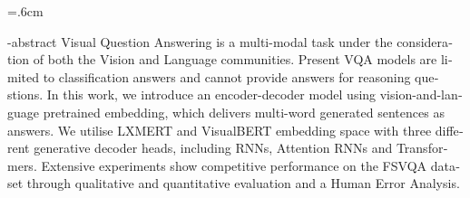 
\baselineskip=.6cm
\begin{latin}
\en-abstract{
  Visual Question Answering is a multi-modal task under the consideration of
   both the Vision and Language communities. Present VQA models are limited 
   to classification answers and cannot provide answers for reasoning questions. 
   In this work, we introduce an encoder-decoder model using vision-and-language 
   pretrained embedding, which delivers multi-word generated sentences as answers. 
   We utilise LXMERT and VisualBERT embedding space with three different generative 
   decoder heads, including RNNs, Attention RNNs and Transformers. Extensive experiments
    show competitive performance on the FSVQA dataset through 
  qualitative and quantitative evaluation and a Human Error Analysis.  
}
\latinfirstPage
\end{latin}
